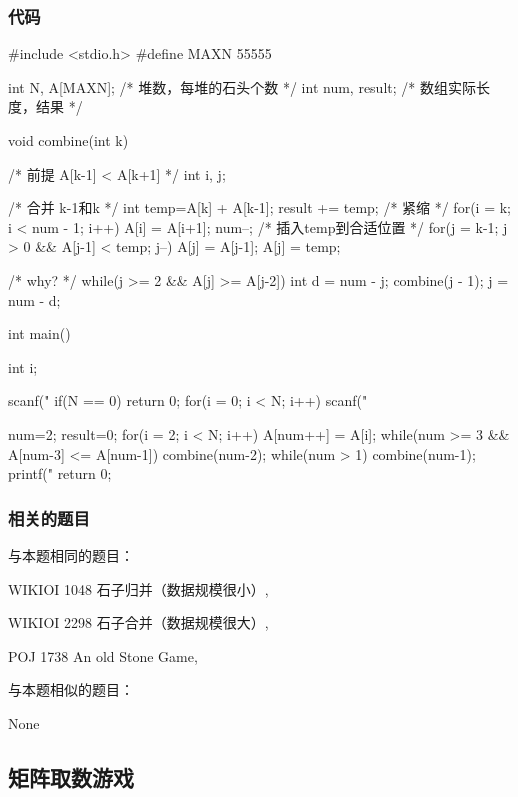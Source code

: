 \subsubsection{代码}
\begin{Codex}[label=stone_merge.c]
#include <stdio.h> 
#define MAXN 55555

int N, A[MAXN];  /* 堆数，每堆的石头个数 */
int num, result;  /* 数组实际长度，结果 */

void combine(int k) {  /* 前提 A[k-1] < A[k+1] */
    int i, j;

    /* 合并 k-1和k */
    int temp=A[k] + A[k-1];
    result += temp;
    /* 紧缩 */
    for(i = k; i < num - 1; i++) A[i] = A[i+1];
    num--;
    /* 插入temp到合适位置 */
    for(j = k-1; j > 0 && A[j-1] < temp; j--) A[j] = A[j-1];
    A[j] = temp;

    /* why? */
    while(j >= 2 && A[j] >= A[j-2]) {
        int d = num - j;
        combine(j - 1);
        j = num - d;
    }
}

int main() {
    int i;

    scanf("%
    if(N == 0)    return 0;
    for(i = 0; i < N; i++) scanf("%

    num=2;
    result=0;
    for(i = 2; i < N; i++) {
        A[num++] = A[i];
        while(num >= 3 && A[num-3] <= A[num-1]) combine(num-2);
    }
    while(num > 1) combine(num-1);
    printf("%
    return 0;
}
\end{Codex}

\subsubsection{相关的题目}
与本题相同的题目：
\begindot
\item WIKIOI 1048 石子归并（数据规模很小）, 
\item WIKIOI 2298 石子合并（数据规模很大）, 
\item POJ 1738 An old Stone Game, 
\myenddot

与本题相似的题目：
\begindot
\item None
\myenddot


\subsection{矩阵取数游戏}
